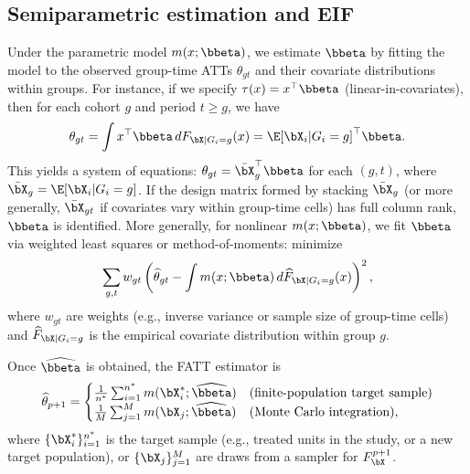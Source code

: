 \documentclass{article}
\begin{document}
\subsection{Semiparametric estimation and EIF}

Under the parametric model $m(x;\bbeta)$, we estimate $\bbeta$ by fitting the model to the observed group-time ATTs $\theta_{gt}$ and their covariate distributions within groups. For instance, if we specify $\tau(x) = x^\top \bbeta$ (linear-in-covariates), then for each cohort $g$ and period $t \geq g$, we have
\begin{align*}
    \theta_{gt} = \int x^\top \bbeta \, dF_{\bX|G_i=g}(x) = \E[\bX_i | G_i=g]^\top \bbeta.
\end{align*}
This yields a system of equations: $\theta_{gt} = \bar{\bX}_g^\top \bbeta$ for each $(g,t)$, where $\bar{\bX}_g = \E[\bX_i | G_i=g]$. If the design matrix formed by stacking $\bar{\bX}_g$ (or more generally, $\bar{\bX}_{gt}$ if covariates vary within group-time cells) has full column rank, $\bbeta$ is identified. More generally, for nonlinear $m(x;\bbeta)$, we fit $\bbeta$ via weighted least squares or method-of-moments: minimize
\begin{align*}
    \sum_{g,t} w_{gt} \left( \widehat{\theta}_{gt} - \int m(x;\bbeta) \, d\widehat{F}_{\bX|G_i=g}(x) \right)^2,
\end{align*}
where $w_{gt}$ are weights (e.g., inverse variance or sample size of group-time cells) and $\widehat{F}_{\bX|G_i=g}$ is the empirical covariate distribution within group $g$.

Once $\widehat{\bbeta}$ is obtained, the FATT estimator is
\begin{align}
    \widehat{\theta}_{p+1} = \begin{cases}
        \frac{1}{n^*} \sum_{i=1}^{n^*} m(\bX_i^*; \widehat{\bbeta}) & \text{(finite-population target sample)} \\
        \frac{1}{M} \sum_{j=1}^{M} m(\bX_j; \widehat{\bbeta}) & \text{(Monte Carlo integration)},
    \end{cases} \label{eq:fatt-path3-est}
\end{align}
where $\{\bX_i^*\}_{i=1}^{n^*}$ is the target sample (e.g., treated units in the study, or a new target population), or $\{\bX_j\}_{j=1}^M$ are draws from a sampler for $F_{\bX}^{p+1}$.
\end{document}
